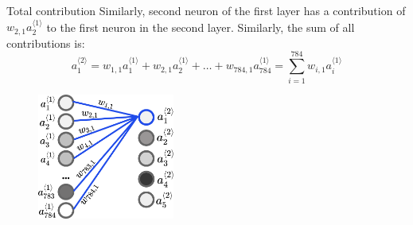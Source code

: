 \documentclass{beamer}
\begin{document}
    \begin{frame}{Total contribution}
        Similarly, second neuron of the first layer has a contribution of $w_{2,1}a_2^{\langle 1 \rangle}$ to the first neuron in the second layer. Similarly, the sum of all contributions is:
        \[
        a_1^{\langle 2 \rangle} = w_{1,1}a_1^{\langle 1 \rangle} + w_{2,1}a_2^{\langle 1 \rangle} + \dots + w_{784,1}a_{784}^{\langle 1 \rangle} = \sum_{i=1}^{784}w_{i,1}a_i^{\langle 1 \rangle}
        \]
    
        \begin{figure}
        \centering
            \includegraphics[width=0.4\textwidth]{images/presentation/layer_all_selected.png}
        \end{figure}
    \end{frame}
\end{document}
